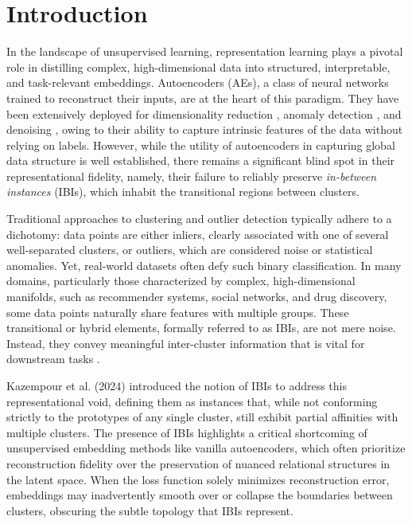 \chapter{Introduction} \label{ch:introduction}

In the landscape of unsupervised learning, representation learning plays a pivotal role in distilling complex, high-dimensional data into structured, interpretable, and task-relevant embeddings. Autoencoders (AEs), a class of neural networks trained to reconstruct their inputs, are at the heart of this paradigm. They have been extensively deployed for dimensionality reduction \cite{Goodfellow16}, anomaly detection \cite{Sakurada14}, and denoising \cite{Vincent08}, owing to their ability to capture intrinsic features of the data without relying on labels. However, while the utility of autoencoders in capturing global data structure is well established, there remains a significant blind spot in their representational fidelity, namely, their failure to reliably preserve \textit{in-between instances} (IBIs), which inhabit the transitional regions between clusters.

Traditional approaches to clustering and outlier detection typically adhere to a dichotomy: data points are either inliers, clearly associated with one of several well-separated clusters, or outliers, which are considered noise or statistical anomalies. Yet, real-world datasets often defy such binary classification. In many domains, particularly those characterized by complex, high-dimensional manifolds, such as recommender systems, social networks, and drug discovery, some data points naturally share features with multiple groups. These transitional or hybrid elements, formally referred to as IBIs, are not mere noise. Instead, they convey meaningful inter-cluster information that is vital for downstream tasks \cite{Kazempour24}.

Kazempour et al. (2024) \cite{Kazempour24} introduced the notion of IBIs to address this representational void, defining them as instances that, while not conforming strictly to the prototypes of any single cluster, still exhibit partial affinities with multiple clusters. The presence of IBIs highlights a critical shortcoming of unsupervised embedding methods like vanilla autoencoders, which often prioritize reconstruction fidelity over the preservation of nuanced relational structures in the latent space. When the loss function solely minimizes reconstruction error, embeddings may inadvertently smooth over or collapse the boundaries between clusters, obscuring the subtle topology that IBIs represent.

